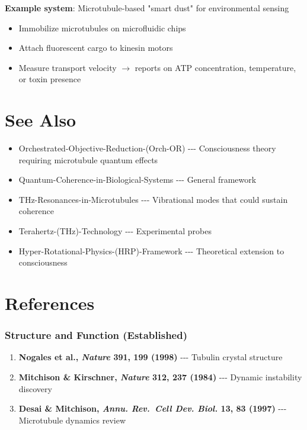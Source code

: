 \textbf{Example system}: Microtubule-based "smart dust" for environmental sensing
\begin{itemize}
\item Immobilize microtubules on microfluidic chips
\item Attach fluorescent cargo to kinesin motors
\item Measure transport velocity $\rightarrow$ reports on ATP concentration, temperature, or toxin presence
\end{itemize}

\section{See Also}
\label{sec:see-also}

\begin{itemize}
\tightlist
\item
  Orchestrated-Objective-Reduction-(Orch-OR) -\/-\/-
  Consciousness theory requiring microtubule quantum effects
\item
  Quantum-Coherence-in-Biological-Systems -\/-\/- General
  framework
\item
  THz-Resonances-in-Microtubules -\/-\/- Vibrational modes
  that could sustain coherence
\item
  Terahertz-(THz)-Technology -\/-\/- Experimental probes
\item
  Hyper-Rotational-Physics-(HRP)-Framework -\/-\/-
  Theoretical extension to consciousness
\end{itemize}

\section{References}
\label{sec:references}

\subsubsection{Structure and Function
(Established)}\label{structure-and-function-established}

\begin{enumerate}
\def\labelenumi{\arabic{enumi}.}
\tightlist
\item
  \textbf{Nogales et al., \emph{Nature} 391, 199 (1998)} -\/-\/- Tubulin
  crystal structure
\item
  \textbf{Mitchison \& Kirschner, \emph{Nature} 312, 237 (1984)} -\/-\/-
  Dynamic instability discovery
\item
  \textbf{Desai \& Mitchison, \emph{Annu. Rev.~Cell Dev. Biol.} 13, 83
  (1997)} -\/-\/- Microtubule dynamics review
\end{enumerate}

